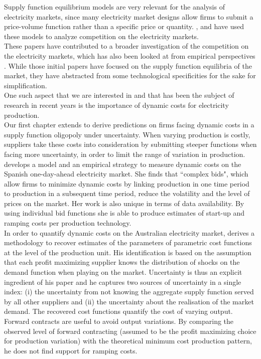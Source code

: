 Supply function equilibrium models are very relevant for the analysis of electricity markets, since many electricity market designs allow firms to submit a price-volume function rather than a specific price or quantity. \cite{Newgreen}, \cite{newbery1998competition} and \cite{bolle1992supply} have used these models to analyze competition on the electricity markets. \\

These papers have contributed to a broader investigation of the competition on the electricity markets, which has also been looked at from empirical perspectives \cite{wolfram1998strategic, borensteinetal2002marketineffs}.
While those initial papers have focused on the supply function equilibria of the market, they have abstracted from some technological specificities for the sake for simplification. \\

One such aspect that we are interested in and that has been the subject of research in recent years is the importance of dynamic costs for electricity production. \\
Our first chapter extends \cite{KM} to derive predictions on firms facing dynamic costs in a supply function oligopoly under uncertainty. 
When varying production is costly, suppliers take these costs into consideration by submitting steeper functions when facing more uncertainty, in order to limit the range of variation in production.
\cite{reguant2011welfare} develops a model and an empirical strategy to measure dynamic costs on the Spanish one-day-ahead electricity market. She finds that ``complex bids", which allow firms to minimize dynamic costs by linking production in one time period to production in a subsequent time period, reduce the volatility and the level of prices on the market.  Her work is also unique in terms of data availability. By using individual bid functions she is able to produce estimates of start-up and ramping costs per production technology. \\

In order to quantify dynamic costs on the Australian electricity market, \cite{wolak2007quantifying} derives a methodology to recover estimates of the parameters of parametric cost functions at the level of the production unit. His identification is based on the assumption that each profit maximizing supplier knows the distribution of shocks on the demand function when playing on the market. Uncertainty is thus an explicit ingredient of his paper and he captures two sources of uncertainty in a single index: (i) the uncertainty from not knowing the aggregate supply function served by all other suppliers and (ii) the uncertainty about the realisation of the market demand.  The recovered cost functions quantify the cost of varying output. Forward contracts are useful to avoid output variations. By comparing the observed  level of forward contracting (assumed to be the profit maximizing choice for production variation) with the theoretical minimum cost production pattern, he %
does not find support for ramping costs.\\

